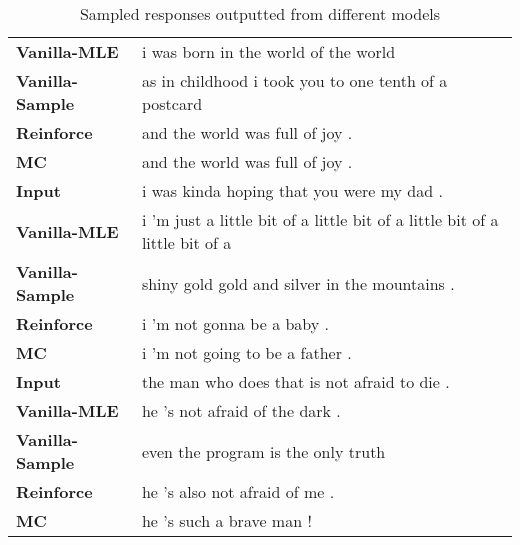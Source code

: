 \begin{table*}[!htb]
\begin{tabular}{p{4cm}p{8cm}}
{\bf Vanilla-MLE}&i was born in the world of the world\\
{\bf Vanilla-Sample}&as in childhood i took you to one tenth of a postcard\\
{\bf Reinforce}&and the world was full of joy .\\
{\bf MC}&and the world was full of joy .\\\midrule
{\bf Input}&i was kinda hoping that you were my dad .\\
{\bf Vanilla-MLE}&i 'm just a little bit of a little bit of a little bit of a little bit of a\\
{\bf Vanilla-Sample}&shiny gold gold and silver in the mountains .\\
{\bf Reinforce}&i 'm not gonna be a baby .\\
{\bf MC}&i 'm not going to be a father .\\\midrule
{\bf Input}&the man who does that is not afraid to die .\\
{\bf Vanilla-MLE}&he 's not afraid of the dark .\\
{\bf Vanilla-Sample}&even the program is the only truth\\
{\bf Reinforce}&he 's also not afraid of me .\\
{\bf MC}&he 's such a brave man !\\\bottomrule
\end{tabular}
\caption{Sampled responses outputted from different models}
\label{example-appendix1}
\end{table*}


